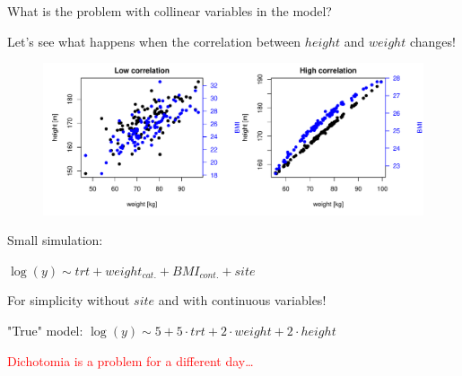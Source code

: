 \documentclass[english]{beamer}\usepackage[]{graphicx}\usepackage[]{xcolor}
\makeatletter
\def\maxwidth{ %
  \ifdim\Gin@nat@width>\linewidth
    \linewidth
  \else
    \Gin@nat@width
  \fi
}
\newenvironment{knitrout}{}{} %
\makeatother
\begin{document}
\begin{frame}{What is the problem with collinear variables in the model?}

Let's see what happens when the correlation between $height$ and $weight$ changes!

\begin{figure}[h]%
\begin{center}
\begin{knitrout}
\color{fgcolor}
\includegraphics[width=\maxwidth]{figures/figcollinearitydata-1} 
\end{knitrout}
\end{center}
\end{figure}

\end{frame}
\begin{frame}{Small simulation:}

\begin{center}
$\boxed{\log(y)\sim trt + weight_{cat.} + BMI_{cont.}+ site}$

For simplicity without $site$ and with continuous variables!

"True" model: $\log(y)\sim 5 + 5\cdot trt + 2\cdot weight + 2\cdot height$





\textcolor{red}{Dichotomia is a problem for a different day\dots}
\end{center}


% 
% 

\end{frame}
\end{document}
